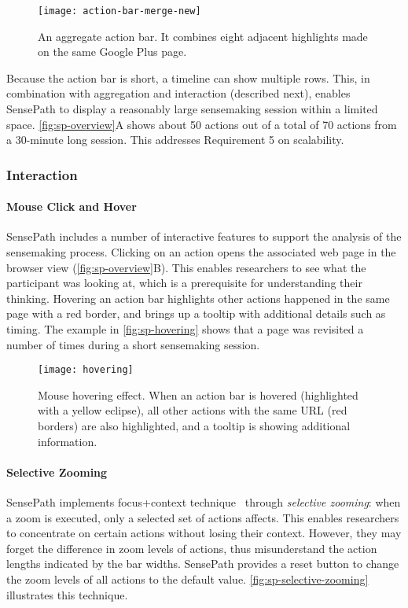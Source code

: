 \begin{figure}[!htb]
\centering
\texttt{[image: action-bar-merge-new]}
\caption{An aggregate action bar. It combines eight adjacent highlights made on the same Google Plus page.}
\label{fig:sp-action-bar-merge}
\end{figure}

Because the action bar is short, a timeline can show multiple rows. This, in combination with aggregation and interaction (described next), enables SensePath to display a reasonably large sensemaking session within a limited space. \autoref{fig:sp-overview}A shows about 50 actions out of a total of 70 actions from a 30-minute long session. This addresses Requirement 5 on scalability.

\subsubsection{Interaction}
\paragraph{Mouse Click and Hover}
SensePath includes a number of interactive features to support the analysis of the sensemaking process. Clicking on an action opens the associated web page in the browser view (\autoref{fig:sp-overview}B). This enables researchers to see what the participant was looking at, which is a prerequisite for understanding their thinking. Hovering an action bar highlights other actions happened in the same page with a red border, and brings up a tooltip with additional details such as timing. The example in \autoref{fig:sp-hovering} shows that a page was revisited a number of times during a short sensemaking session.

\begin{figure}[!htb]
\centering
\texttt{[image: hovering]}
\caption{Mouse hovering effect. When an action bar is hovered (highlighted with a yellow eclipse), all other actions with the same URL (red borders) are also highlighted, and a tooltip is showing additional information.}
\label{fig:sp-hovering}
\end{figure}

\paragraph{Selective Zooming}
SensePath implements focus+context technique~\cite{Cockburn2008} through \emph{selective zooming}: when a zoom is executed, only a selected set of actions affects. This enables researchers to concentrate on certain actions without losing their context. However, they may forget the difference in zoom levels of actions, thus misunderstand the action lengths indicated by the bar widths. SensePath provides a reset button to change the zoom levels of all actions to the default value. \autoref{fig:sp-selective-zooming} illustrates this technique.

